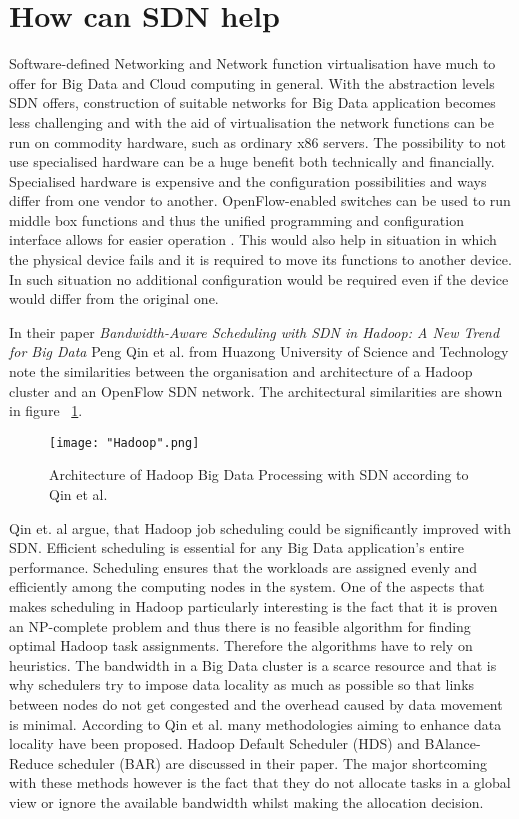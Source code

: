 \documentclass{acm_proc_article-sp}
\begin{document}
\section{How can SDN help}


Software-defined Networking and Network function virtualisation have much to offer for Big Data and Cloud computing in general. With the abstraction levels SDN offers, construction of suitable networks for Big Data application becomes less challenging and with the aid of virtualisation the network functions can be run on commodity hardware, such as ordinary x86 servers. The possibility to not use specialised hardware can be a huge benefit both technically and financially. Specialised hardware is expensive and the configuration possibilities and ways differ from one vendor to another. OpenFlow-enabled switches can be used to run middle box functions and thus the unified programming and configuration interface allows for easier operation . This would also help in situation in which the physical device fails and it is required to move its functions to another device. In such situation no additional configuration would be required even if the device would differ from the original one. 

In their paper \textit{Bandwidth-Aware Scheduling with SDN in Hadoop: A New Trend for Big Data} \cite{Scheduling} Peng Qin et al. from Huazong University of Science and Technology note the similarities between the organisation and architecture of a Hadoop cluster and an OpenFlow SDN network. The architectural similarities are shown in figure ~\ref{fig:hadoop}.

\begin{figure}[ht!]
\centering
{}
\texttt{[image: "Hadoop".png]}
\caption{Architecture of Hadoop Big Data Processing with SDN according to Qin et al. \cite{Scheduling}}
\label{fig:hadoop}
\end{figure} 

Qin et. al argue, that Hadoop job scheduling could be significantly improved with SDN. Efficient scheduling is essential for any Big Data application's entire performance. Scheduling ensures that the workloads are assigned evenly and efficiently among the computing nodes in the system. One of the aspects that makes scheduling in Hadoop particularly interesting is the fact that it is proven an NP-complete problem \cite{Fischer:2010:ATE:1810479.1810484} and thus there is no feasible algorithm for finding optimal Hadoop task assignments. Therefore the algorithms have to rely on heuristics. The bandwidth in a Big Data cluster is a scarce resource and that is why schedulers try to impose data locality as much as possible so that links between nodes do not get congested and the overhead caused by data movement is minimal. According to Qin et al. many methodologies aiming to enhance data locality have been proposed. Hadoop Default Scheduler (HDS) and BAlance-Reduce scheduler (BAR) are discussed in their paper. The major shortcoming with these methods however is the fact that they do not allocate tasks in a global view or ignore the available bandwidth whilst making the allocation decision.
\end{document}
